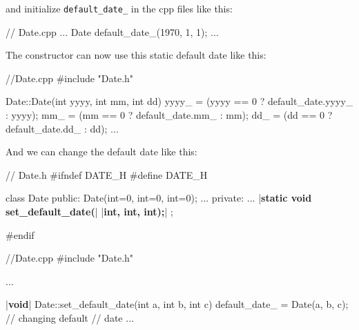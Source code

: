 and initialize \texttt{default\_date\_} in the cpp files like this:

\begin{consolethree}[escapeinside=||]
// Date.cpp
...
Date default_date_(1970, 1, 1);
...
\end{consolethree}

The constructor can now use this static default date like this:

\begin{consolethree}[escapeinside=||]
//Date.cpp
#include "Date.h"

Date::Date(int yyyy, int mm, int dd)
{
    yyyy_ = (yyyy == 0 ? default_date.yyyy_ : yyyy);
    mm_ = (mm == 0 ? default_date.mm_ : mm);
    dd_ = (dd == 0 ? default_date.dd_ : dd);
}
...
\end{consolethree}

And we can change the default date like this:

\begin{consolethree}[escapeinside=||]
// Date.h
#ifndef DATE_H
#define DATE_H

class Date
{
public:
    Date(int=0, int=0, int=0);
    ...
private:
    ...
    |{\bf static void set\_default\_date(}|
        |{\bf int, int, int);}|
};

#endif
\end{consolethree}

\begin{consolethree}[escapeinside=||]
//Date.cpp
#include "Date.h"

...

|{\bf void}| Date::set_default_date(int a, int b, int c)
{
    default_date_ = Date(a, b, c); // changing default
                                   // date
}
...
\end{consolethree}









